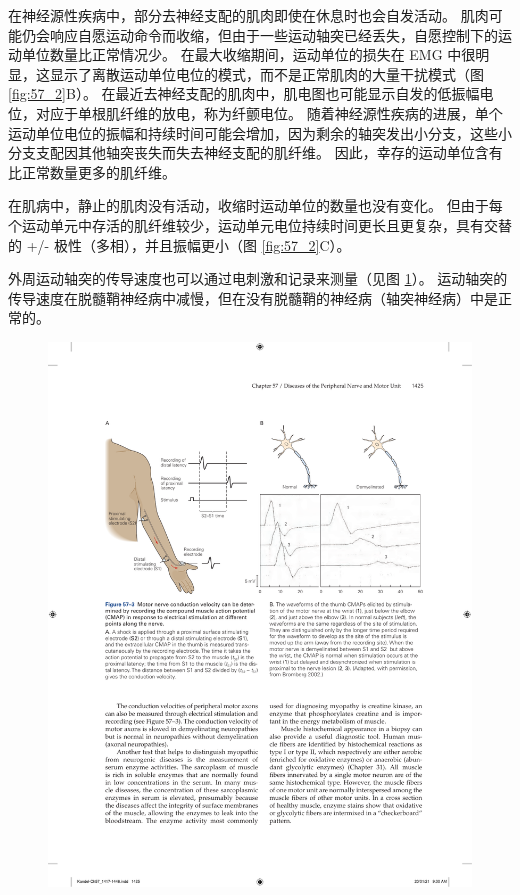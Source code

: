 在神经源性疾病中，部分去神经支配的肌肉即使在休息时也会自发活动。
肌肉可能仍会响应自愿运动命令而收缩，但由于一些运动轴突已经丢失，自愿控制下的运动单位数量比正常情况少。
在最大收缩期间，运动单位的损失在 EMG 中很明显，这显示了离散运动单位电位的模式，而不是正常肌肉的大量干扰模式（图 \ref{fig:57_2}B）。
在最近去神经支配的肌肉中，肌电图也可能显示自发的低振幅电位，对应于单根肌纤维的放电，称为纤颤电位。
随着神经源性疾病的进展，单个运动单位电位的振幅和持续时间可能会增加，因为剩余的轴突发出小分支，这些小分支支配因其他轴突丧失而失去神经支配的肌纤维。
因此，幸存的运动单位含有比正常数量更多的肌纤维。


在肌病中，静止的肌肉没有活动，收缩时运动单位的数量也没有变化。
但由于每个运动单元中存活的肌纤维较少，运动单元电位持续时间更长且更复杂，具有交替的 +/- 极性（多相），并且振幅更小（图 \ref{fig:57_2}C）。


外周运动轴突的传导速度也可以通过电刺激和记录来测量（见图 \ref{fig:57_3}）。
运动轴突的传导速度在脱髓鞘神经病中减慢，但在没有脱髓鞘的神经病（轴突神经病）中是正常的。


\begin{figure}[htbp]
	\centering
	\includegraphics[width=0.95\linewidth]{chap57/fig_57_3}
	\caption{}
	\label{fig:57_3}
\end{figure}



